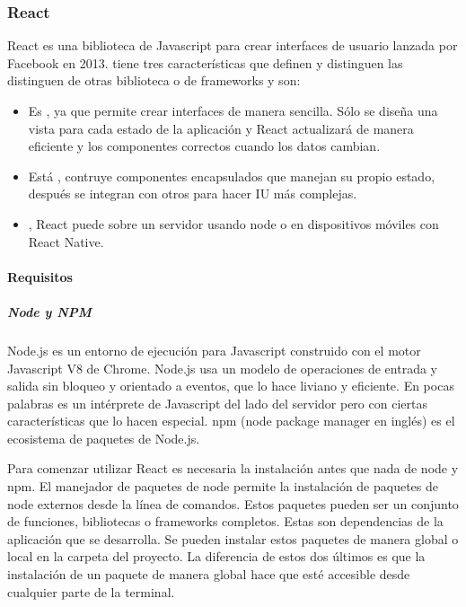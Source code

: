 \subsubsection{React}
\label{\detokenize{reactjs::doc}}\label{\detokenize{reactjs:react}}
React es una biblioteca de Javascript para crear interfaces de usuario
lanzada por Facebook en 2013.
tiene tres características que definen y distinguen las distinguen de otras
biblioteca o de frameworks y son:
\begin{itemize}
\item {} 
Es , ya que permite crear interfaces de manera sencilla. Sólo se diseña una vista para cada estado de la aplicación y React actualizará de manera eficiente y  los componentes correctos cuando los datos cambian.

\item {} 
Está , contruye componentes encapsulados que manejan su propio estado, después se integran con otros para hacer IU más complejas.

\item {} 
, React puede  sobre un servidor usando node o en dispositivos móviles con React Native.

\end{itemize}


\paragraph{Requisitos}
\label{\detokenize{reactjs:requisitos}}

\subparagraph{Node y NPM}
\label{\detokenize{reactjs:node-y-npm}}
Node.js es un entorno de ejecución para Javascript construido con el motor
Javascript V8 de Chrome. Node.js usa un modelo de operaciones de entrada y
salida sin bloqueo y orientado a eventos, que lo hace liviano y eficiente.
En pocas palabras es un intérprete de Javascript del lado del servidor pero
con ciertas características que lo hacen especial. npm (node package manager
en inglés) es el ecosistema de paquetes de Node.js.

Para comenzar utilizar React es necesaria la instalación antes que nada
de node y npm. El manejador de paquetes de node permite la instalación de
paquetes de node externos desde la línea de comandos. Estos paquetes  pueden
ser un conjunto de funciones, bibliotecas o frameworks completos. Estas son
dependencias de la aplicación que se desarrolla. Se pueden instalar estos
paquetes de manera global o local en la carpeta del proyecto. La diferencia
de estos dos últimos es que la instalación de un paquete de manera global
hace que esté accesible desde cualquier parte de la terminal.

